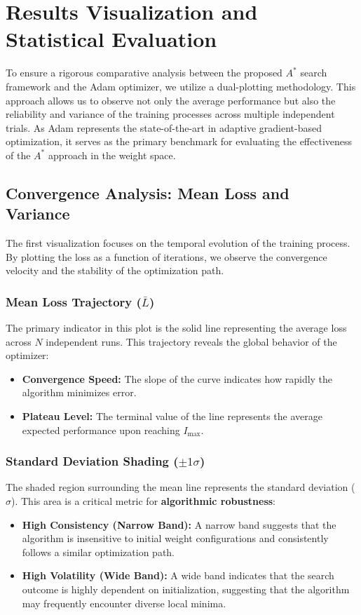 \chapter{Results Visualization and Statistical Evaluation}
\label{chap:plot_logic}

To ensure a rigorous comparative analysis between the proposed $A^*$ search framework and the Adam optimizer, we utilize a dual-plotting methodology. This approach allows us to observe not only the average performance but also the reliability and variance of the training processes across multiple independent trials. As Adam represents the state-of-the-art in adaptive gradient-based optimization, it serves as the primary benchmark for evaluating the effectiveness of the $A^*$ approach in the weight space.
\section{Convergence Analysis: Mean Loss and Variance}
The first visualization focuses on the temporal evolution of the training process. By plotting the loss as a function of iterations, we observe the convergence velocity and the stability of the optimization path.

\subsection{Mean Loss Trajectory ($\bar{L}$)}
The primary indicator in this plot is the solid line representing the average loss across $N$ independent runs. This trajectory reveals the global behavior of the optimizer:
\begin{itemize}
    \item \textbf{Convergence Speed:} The slope of the curve indicates how rapidly the algorithm minimizes error.
    \item \textbf{Plateau Level:} The terminal value of the line represents the average expected performance upon reaching $I_{\text{max}}$.
\end{itemize}

\subsection{Standard Deviation Shading ($\pm 1\sigma$)}
The shaded region surrounding the mean line represents the standard deviation ($\sigma$). This area is a critical metric for \textbf{algorithmic robustness}:
\begin{itemize}
    \item \textbf{High Consistency (Narrow Band):} A narrow band suggests that the algorithm is insensitive to initial weight configurations and consistently follows a similar optimization path.
    \item \textbf{High Volatility (Wide Band):} A wide band indicates that the search outcome is highly dependent on initialization, suggesting that the algorithm may frequently encounter diverse local minima.
\end{itemize}



